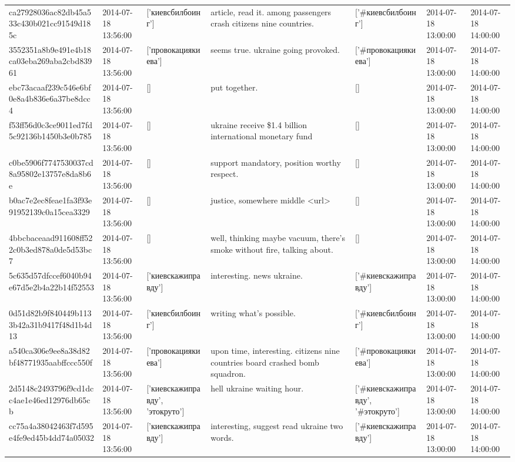 \begin{tabular}{lllllll}
ca27928036ac82db45a533c430b021cc91549d185c & 2014-07-18 13:56:00 & ['киевсбилбоинг'] & article, read it. among passengers crash citizens nine countries. & ['#киевсбилбоинг'] & 2014-07-18 13:00:00 & 2014-07-18 14:00:00 \\
3552351a8b9e491e4b18ca03eba269aba2cbd83961 & 2014-07-18 13:56:00 & ['провокациякиева'] & seems true. ukraine going provoked. & ['#провокациякиева'] & 2014-07-18 13:00:00 & 2014-07-18 14:00:00 \\
ebc73acaaf239c546e6bf0e8a4b836e6a37be8dcc4 & 2014-07-18 13:56:00 & [] & put together. & [] & 2014-07-18 13:00:00 & 2014-07-18 14:00:00 \\
f53ff56d0c3ce9011ed7fd5c92136b1450b3e0b785 & 2014-07-18 13:56:00 & [] & ukraine receive \$1.4 billion international monetary fund & [] & 2014-07-18 13:00:00 & 2014-07-18 14:00:00 \\
c0be5906f7747530037cd8a95802e13757e8da8b6e & 2014-07-18 13:56:00 & [] & support mandatory, position worthy respect. & [] & 2014-07-18 13:00:00 & 2014-07-18 14:00:00 \\
b0ac7e2ec8feae1fa3f93e91952139c0a15cea3329 & 2014-07-18 13:56:00 & [] & justice, somewhere middle <url> & [] & 2014-07-18 13:00:00 & 2014-07-18 14:00:00 \\
4bbcbaceaad911608ff522c0b3ed878a0de5d53bc7 & 2014-07-18 13:56:00 & [] & well, thinking maybe vacuum, there's smoke without fire, talking about. & [] & 2014-07-18 13:00:00 & 2014-07-18 14:00:00 \\
5c635d57dfccef6040b94e67d5e2b4a22b14f52553 & 2014-07-18 13:56:00 & ['киевскажиправду'] & interesting. news ukraine. & ['#киевскажиправду'] & 2014-07-18 13:00:00 & 2014-07-18 14:00:00 \\
0d51d82b9f840449b1133b42a31b9417f48d1b4d13 & 2014-07-18 13:56:00 & ['киевсбилбоинг'] & writing what's possible. & ['#киевсбилбоинг'] & 2014-07-18 13:00:00 & 2014-07-18 14:00:00 \\
a540ca306e9ee8a38d82bf48771935aabffccc550f & 2014-07-18 13:56:00 & ['провокациякиева'] & upon time, interesting. citizens nine countries board crashed bomb squadron. & ['#провокациякиева'] & 2014-07-18 13:00:00 & 2014-07-18 14:00:00 \\
2d5148c2493796f9cd1dcc4ae1e46ed12976db65cb & 2014-07-18 13:56:00 & ['киевскажиправду', 'этокруто'] & hell ukraine waiting hour. & ['#киевскажиправду', '#этокруто'] & 2014-07-18 13:00:00 & 2014-07-18 14:00:00 \\
cc75a4a38042463f7d595e4fe9ed45b4dd74a05032 & 2014-07-18 13:56:00 & ['киевскажиправду'] & interesting, suggest read ukraine two words. & ['#киевскажиправду'] & 2014-07-18 13:00:00 & 2014-07-18 14:00:00 \\

\end{tabular}
